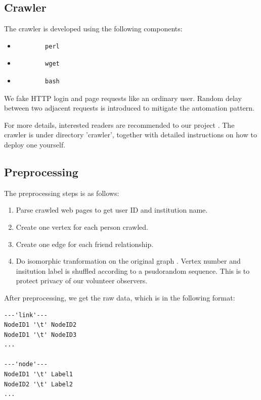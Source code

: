 \documentclass[11pt,a4paper]{article}
\begin{document}
\subsection{Crawler}

The crawler is developed using the following components:
\begin{itemize}
	\item \begin{verbatim}
		perl
	\end{verbatim}
	\item \begin{verbatim}
		wget
	\end{verbatim}
	\item \begin{verbatim}
		bash
	\end{verbatim}
\end{itemize}

We fake HTTP login and page requests like an ordinary user. 
Random delay between two adjacent requests is introduced 
to mitigate the automation pattern. 

For more details, interested readers are recommended to 
our project \cite{hu2011-cd2hop}. The crawler is under 
directory 'crawler', together with detailed instructions 
on how to deploy one yourself. 

\subsection{Preprocessing}

The preprocessing steps is as follows:
\begin{enumerate}
	\item Parse crawled web pages to get user ID and institution name. 
	\item Create one vertex for each person crawled. 
	\item Create one edge for each friend relationship. 
	\item Do isomorphic tranformation on the original graph
	\cite{wiki_iso_graph}. Vertex number and insitution label 
	is shuffled according to a psudorandom sequence. 
	This is to protect privacy of our volunteer observers. 
\end{enumerate}

After preprocessing, we get the raw data, which is in the
following format:
\begin{Verbatim}
---'link'---
NodeID1 '\t' NodeID2
NodeID1 '\t' NodeID3
...

---'node'---
NodeID1 '\t' Label1
NodeID2 '\t' Label2
...
\end{Verbatim}
\end{document}
